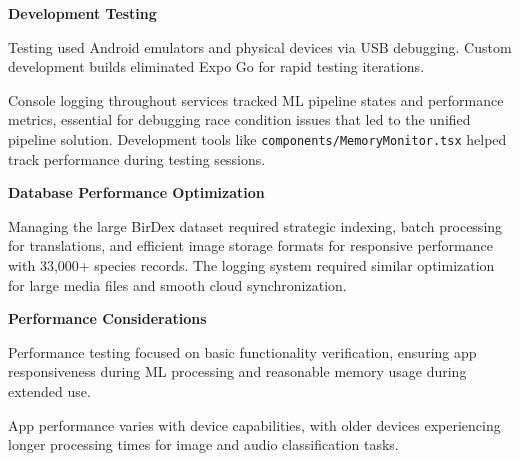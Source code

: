 \textbf{Development Testing}

Testing used Android emulators and physical devices via USB debugging. Custom development builds eliminated Expo Go for rapid testing iterations.

Console logging throughout services tracked ML pipeline states and performance metrics, essential for debugging race condition issues that led to the unified pipeline solution. Development tools like \texttt{components/MemoryMonitor.tsx} helped track performance during testing sessions.

\textbf{Database Performance Optimization}

Managing the large BirDex dataset required strategic indexing, batch processing for translations, and efficient image storage formats for responsive performance with 33,000+ species records. The logging system required similar optimization for large media files and smooth cloud synchronization.

\textbf{Performance Considerations}

Performance testing focused on basic functionality verification, ensuring app responsiveness during ML processing and reasonable memory usage during extended use.

App performance varies with device capabilities, with older devices experiencing longer processing times for image and audio classification tasks.